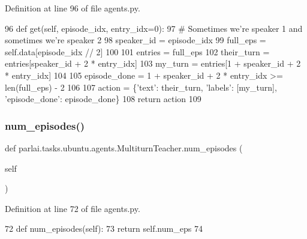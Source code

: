 Definition at line 96 of file agents.\+py.


\begin{DoxyCode}
96     \textcolor{keyword}{def }get(self, episode\_idx, entry\_idx=0):
97         \textcolor{comment}{# Sometimes we're speaker 1 and sometimes we're speaker 2}
98         speaker\_id = episode\_idx %
99         full\_eps = self.data[episode\_idx // 2]
100 
101         entries = full\_eps
102         their\_turn = entries[speaker\_id + 2 * entry\_idx]
103         my\_turn = entries[1 + speaker\_id + 2 * entry\_idx]
104 
105         episode\_done = 1 + speaker\_id + 2 * entry\_idx >= len(full\_eps) - 2
106 
107         action = \{\textcolor{stringliteral}{'text'}: their\_turn, \textcolor{stringliteral}{'labels'}: [my\_turn], \textcolor{stringliteral}{'episode\_done'}: episode\_done\}
108         \textcolor{keywordflow}{return} action
109 
\end{DoxyCode}
\mbox{\label{classparlai_1_1tasks_1_1ubuntu_1_1agents_1_1MultiturnTeacher_a420b358909e5dd3dcbf2ec4bb3b3080d}} 
\subsubsection{\texorpdfstring{num\+\_\+episodes()}{num\_episodes()}}
{\footnotesize\ttfamily def parlai.\+tasks.\+ubuntu.\+agents.\+Multiturn\+Teacher.\+num\+\_\+episodes (\begin{DoxyParamCaption}\item[{}]{self }\end{DoxyParamCaption})}



Definition at line 72 of file agents.\+py.


\begin{DoxyCode}
72     \textcolor{keyword}{def }num\_episodes(self):
73         \textcolor{keywordflow}{return} self.num\_eps
74 
\end{DoxyCode}
\mbox{\label{classparlai_1_1tasks_1_1ubuntu_1_1agents_1_1MultiturnTeacher_a0267166445ce66e04d2f71233c12d5dc}} 
